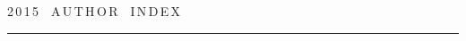 \def\stat{cont-e}


{%




\raggedleft\Large \bf%


2\,0\,1\,5\ \ A\,U\,T\,H\,O\,R\ \ I\,N\,D\,E\,X \vskip 17pt


    \hrule


    \par




 }





\label{st\stat}

















\def\leftkol{\ } %


\def\rightkol{\ } %










\vspace*{-12pt}










\def\leftfootline{\small{\textbf{\thepage}


\hfill Sistemy i Sredstva Informatiki~---


Systems and Means of Informatics 2015 vol~25 no\,4}


}%


 \def\rightfootline{\small{Sistemy i Sredstva Informatiki~---


 Systems and Means of Informatics   2015   vol~25   no\,4


\hfill \textbf{\thepage}}}








